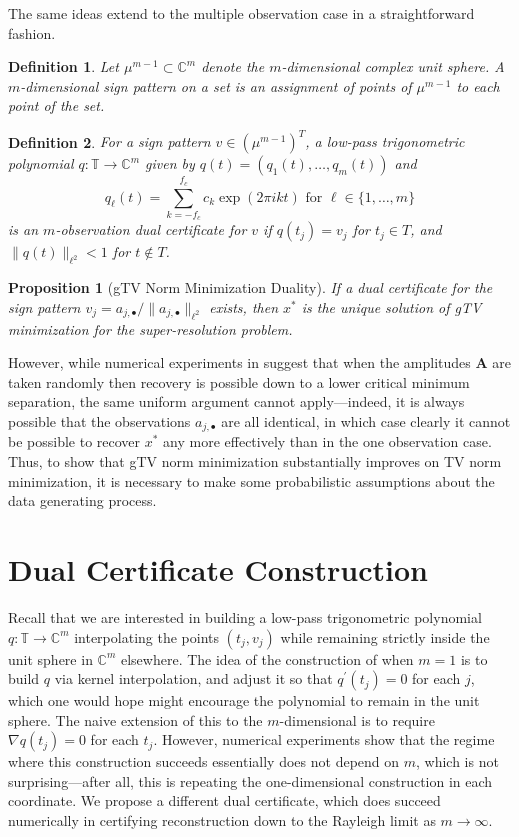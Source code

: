 \documentclass[11pt]{article}
\newcommand{\TT}{\mathbb{T}}
\newcommand{\CC}{\mathbb{C}}
\newcommand{\bA}{\bm A}
\newtheorem{definition}{Definition}
\newtheorem{proposition}{Proposition}
\begin{document}
The same ideas extend to the multiple observation case in a straightforward fashion.
\begin{definition}
    Let $\mu^{m - 1} \subset \CC^m$ denote the $m$-dimensional complex unit sphere.
    A \emph{$m$-dimensional sign pattern} on a set is an assignment of points of $\mu^{m - 1}$ to each point of the set.
\end{definition}
\begin{definition}
    For a sign pattern $v \in (\mu^{m - 1})^T$, a low-pass trigonometric polynomial $q: \TT \to \CC^m$ given by $q(t) = (q_1(t), \dots, q_m(t))$ and
    \begin{equation}
        q_\ell(t) = \sum_{k = -f_c}^{f_c} c_k \exp(2\pi i k t) \text{ for } \ell \in \{1, \dots, m\}
    \end{equation}
    is an \emph{$m$-observation dual certificate} for $v$ if $q(t_j) = v_j$ for $t_j \in T$, and $\|q(t)\|_{\ell^2} < 1$ for $t \notin T$.
\end{definition}
\begin{proposition}[gTV Norm Minimization Duality]
    If a dual certificate for the sign pattern $v_j = a_{j, \bullet} / \|a_{j, \bullet}\|_{\ell^2}$ exists, then $x^*$ is the unique solution of gTV minimization for the super-resolution problem.
\end{proposition}
However, while numerical experiments in \cite{fernandez2016super} suggest that when the amplitudes $\bA$ are taken randomly then recovery is possible down to a lower critical minimum separation, the same uniform argument cannot apply---indeed, it is always possible that the observations $a_{j, \bullet}$ are all identical, in which case clearly it cannot be possible to recover $x^*$ any more effectively than in the one observation case.
Thus, to show that gTV norm minimization substantially improves on TV norm minimization, it is necessary to make some probabilistic assumptions about the data generating process.

\section{Dual Certificate Construction}

Recall that we are interested in building a low-pass trigonometric polynomial $q: \TT \to \CC^m$ interpolating the points $(t_j, v_j)$ while remaining strictly inside the unit sphere in $\CC^m$ elsewhere.
The idea of the construction of \cite{fernandez2016super} when $m = 1$ is to build $q$ via kernel interpolation, and adjust it so that $q^\prime(t_j) = 0$ for each $j$, which one would hope might encourage the polynomial to remain in the unit sphere.
The naive extension of this to the $m$-dimensional is to require $\nabla q(t_j) = 0$ for each $t_j$.
However, numerical experiments show that the regime where this construction succeeds essentially does not depend on $m$, which is not surprising---after all, this is repeating the one-dimensional construction in each coordinate.
We propose a different dual certificate, which does succeed numerically in certifying reconstruction down to the Rayleigh limit as $m \to \infty$.
\end{document}
